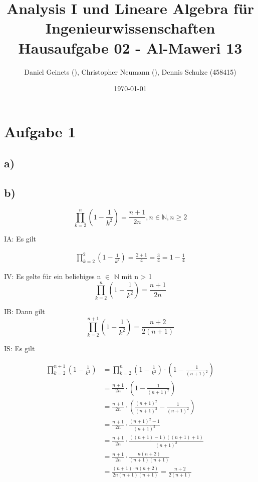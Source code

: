 \documentclass[a4paper, 11pt]{article}
\author{Daniel Geinets (), Christopher Neumann (), Dennis Schulze (458415)}
\date{\today}
\title{Analysis I und Lineare Algebra für Ingenieurwissenschaften \large  \\ Hausaufgabe 02 - Al-Maweri 13}
\begin{document}
\maketitle
\tableofcontents

\setcounter{secnumdepth}{0}
\newcommand{\tuple}[1]{\left(#1\right)}
\newcommand{\R}{\mathbb{R}}
\newcommand{\Q}{\mathbb{Q}}
\newcommand{\N}{\mathbb{N}}
\newcommand{\C}{\mathbb{C}}

\pagebreak

\section{Aufgabe 1}
\label{sec:org0ae6b3c}
\subsection{a)}
\label{sec:org2c1632a}
\subsection{b)}
\label{sec:org168152a}
$$ \prod_{k=2}^{n} \tuple{1 - \frac{1}{k^2}} = \frac{n + 1}{2n}, n \in \N, n \geq 2 $$

IA:
  Es gilt

\begin{align*}
    \prod_{k = 2}^{2} \tuple{1 - \frac{1}{k^2}} = \frac{2 + 1}{4}
    = \frac{3}{4}
    = 1 - \frac{1}{4}
\end{align*}

IV:
  Es gelte für ein beliebiges n \(\in\) \(\N\) mit n > 1
$$ \prod_{k=2}^{n} \tuple{1 - \frac{1}{k^2}} = \frac{n + 1}{2n} $$

IB:
  Dann gilt
$$ \prod_{k=2}^{n + 1} \tuple{1 - \frac{1}{k^2}} = \frac{n + 2}{2(n + 1)} $$

IS:
  Es gilt

\begin{align*}
    \prod_{k = 2}^{n + 1} \tuple{1 - \frac{1}{k^2}} &= \prod_{k = 2}^{n} \tuple{1 - \frac{1}{k^2}} \cdot \tuple{1 - \frac{1}{(n + 1)^2}} \\
    &= \frac{n + 1}{2n} \cdot \tuple{1 - \frac{1}{(n + 1)^2}} \\
    &= \frac{n + 1}{2n} \cdot \tuple{\frac{(n+1)^2}{(n+1)^2} - \frac{1}{(n + 1)^2}} \\
    &= \frac{n + 1}{2n} \cdot \frac{(n+1)^2 - 1}{(n+1)^2} \\
    &= \frac{n + 1}{2n} \cdot \frac{((n+1) - 1)((n+1) + 1)}{(n + 1)^2} \\
    &= \frac{n + 1}{2n} \cdot \frac{n(n + 2)}{(n + 1)(n + 1)} \\
    &= \frac{(n + 1) \cdot n(n + 2)}{2n(n + 1)(n + 1)}
    = \frac{n + 2}{2(n + 1)}
\end{align*}
\end{document}
